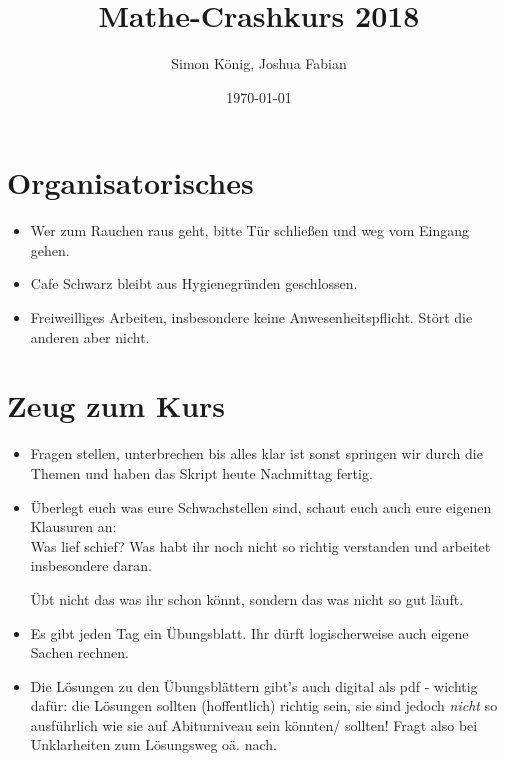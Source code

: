 \documentclass[a4paper, oneside]{article}
\title{Mathe-Crashkurs 2018}
\date{\today}
\author{Simon König, Joshua Fabian}
\begin{document}
\section*{Organisatorisches}
	\begin{itemize}
		\item Wer zum Rauchen raus geht, bitte Tür schließen und weg vom Eingang gehen.
		\item Cafe Schwarz bleibt aus Hygienegründen geschlossen.
		\item Freiweilliges Arbeiten, insbesondere keine Anwesenheitspflicht. Stört die anderen aber nicht.
	\end{itemize}

\clearpage
\section*{Zeug zum Kurs}
\begin{multicols}{2}
	\begin{itemize}
		\setlength\itemsep{3em}
			\item Fragen stellen, unterbrechen bis alles klar ist sonst springen wir durch die Themen und haben das Skript heute Nachmittag fertig.
			\item Überlegt euch was eure Schwachstellen sind, schaut euch auch eure eigenen Klausuren an:\\
			Was lief schief? Was habt ihr noch nicht so richtig verstanden und arbeitet insbesondere daran.

			Übt nicht das was ihr schon könnt, sondern das was nicht so gut läuft.
			\item Es gibt jeden Tag ein Übungsblatt. Ihr dürft logischerweise auch eigene Sachen rechnen.
			\item Die Lösungen zu den Übungsblättern gibt's auch digital als pdf - wichtig dafür: die Lösungen sollten (hoffentlich) richtig sein, sie sind jedoch \emph{nicht} so ausführlich wie sie auf Abiturniveau sein könnten/ sollten! Fragt also bei Unklarheiten zum Lösungsweg oä. nach.
	\end{itemize}
\end{multicols}

\clearpage
\end{document}

